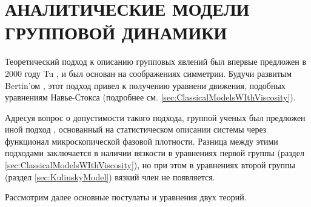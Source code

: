 \chapter{АНАЛИТИЧЕСКИЕ МОДЕЛИ ГРУППОВОЙ ДИНАМИКИ}
\label{ch:TheoreticalModels}

Теоретический подход к описанию групповых явлений был впервые предложен в 2000 году Tu \cite{tu2000}, и был основан на соображениях симметрии. Будучи развитым Bertin'ом \cite{bertin2006}, этот подход привел к получению уравнени движения, подобных уравнениям Навье-Стокса (подробнее см. \ref{sec:ClassicalModelsWIthViscosity}).

Адресуя вопрос о допустимости такого подхода, группой ученых был предложен иной подход \cite{ratushnaya2007,chepizhko2013}, основанный на статистическом описании системы через функционал микроскопической фазовой плотности. Разница между этими подходами заключается в наличии вязкости в уравнениях первой группы (раздел \ref{sec:ClassicalModelsWIthViscosity}), но при этом в уравнениях второй группы (раздел \ref{sec:KulinskyModel}) вязкий член не появляется.

Рассмотрим далее основные постулаты и уравнения двух теорий.




